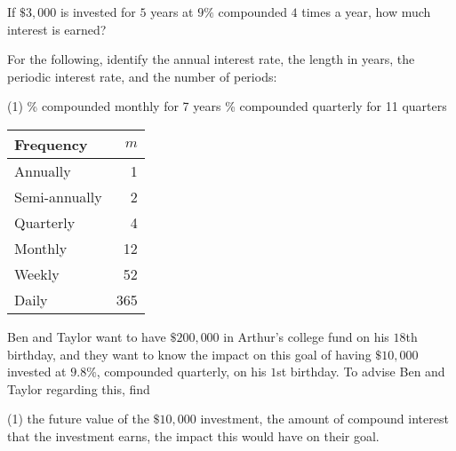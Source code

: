 \documentclass[../mathNotesPreamble]{subfiles}
\begin{document}
    \begin{ex*}
      If $\$3,000$ is invested for $5$ years at $9\%$ compounded $4$ times a year, how
much interest is earned?
    \end{ex*}
    \pagebreak
    
    \noindent
    \begin{minipage}{0.74\linewidth}
      \begin{ex*}
        For the following, identify the annual interest rate, the length in years, the periodic interest rate, and the number of periods:
      \end{ex*}
      \begin{extasks}[after-item-skip=2\baselineskip](1)
        \% compounded monthly for 7 years
        \% compounded quarterly for 11 quarters
      \end{extasks}
      \vspace*{2\baselineskip}
    \end{minipage}%
    \begin{minipage}{0.225\linewidth}%
      \begin{tabular}{@{}lr@{}}\toprule
        Frequency& $m$\\\midrule
        Annually& 1\\
        Semi-annually& 2\\
        Quarterly& 4\\
        Monthly& 12\\
        Weekly& 52\\
        Daily& 365\\\bottomrule
      \end{tabular}
    \end{minipage}
  
  \begin{ex*}
    Ben and Taylor want to have $\$200,000$ in Arthur’s college fund on his
$18$th birthday, and they want to know the impact on this goal of
having $\$10,000$ invested at $9.8\%$, compounded quarterly, on his $1$st
birthday. To advise Ben and Taylor regarding this, find 
    \begin{extasks}[after-item-skip=\stretch{1}](1)
      \task the future value of the $\$10,000$ investment,
      \task the amount of compound interest that the investment earns,
      \task the impact this would have on their goal.
    \end{extasks}
  \end{ex*}
  \pagebreak
  
\end{document}
